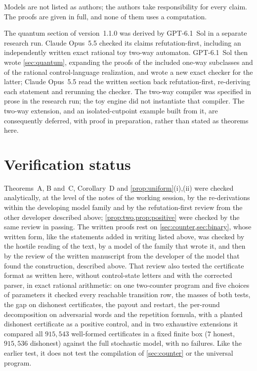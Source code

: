 \documentclass[11pt]{article}
\theoremstyle{plain}
\theoremstyle{definition}
\theoremstyle{remark}
\begin{document}
Models are not listed as authors; the authors take responsibility for every claim. The proofs are given in full, and none of them uses a computation.

The quantum section of version~1.1.0 was derived by GPT-6.1~Sol in a separate research run. Claude Opus~5.5 checked its claims refutation-first, including an independently written exact rational toy two-way automaton. GPT-6.1~Sol then wrote \cref{sec:quantum}, expanding the proofs of the included one-way subclasses and of the rational control-language realization, and wrote a new exact checker for the latter; Claude Opus~5.5 read the written section back refutation-first, re-deriving each statement and rerunning the checker. The two-way compiler was specified in prose in the research run; the toy engine did not instantiate that compiler. The two-way extension, and an isolated-cutpoint example built from it, are consequently deferred, with proof in preparation, rather than stated as theorems here.
\section*{Verification status}

Theorems~A, B and~C, Corollary~D and \cref{prop:uniform}(i),(ii) were checked analytically, at the level of the notes of the working session, by the re-derivations within the developing model family and by the refutation-first review from the other developer described above; \cref{prop:two,prop:positive} were checked by the same review in passing. The written proofs rest on \cref{sec:counter,sec:binary}, whose written form, like the statements added in writing listed above, was checked by the hostile reading of the text, by a model of the family that wrote it, and then by the review of the written manuscript from the developer of the model that found the construction, described above. That review also tested the certificate format as written here, without control-state letters and with the corrected parser, in exact rational arithmetic: on one two-counter program and five choices of parameters it checked every reachable transition row, the masses of both tests, the gap on dishonest certificates, the payout and restart, the per-round decomposition on adversarial words and the repetition formula, with a planted dishonest certificate as a positive control, and in two exhaustive extensions it compared all $915{,}543$ well-formed certificates in a fixed finite box ($7$ honest, $915{,}536$ dishonest) against the full stochastic model, with no failures. Like the earlier test, it does not test the compilation of \cref{sec:counter} or the universal program.
\end{document}
